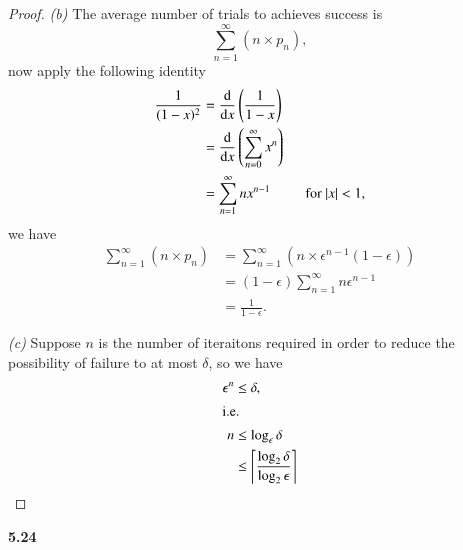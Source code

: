 \documentclass[12pt,a4paper]{article}
\theoremstyle{solution}
\begin{document}
\begin{proof}
{\em (b)} The average number of trials to achieves success is
$$
\sum_{n=1}^{\infty} (n\times p_n),
$$
now apply the following identity
\begin{align*}
\frac{1}{(1-x)^2} &=\frac{\mathrm{d}}{\mathrm{d}x}\left(\frac{1}{1-x}\right) \\
&=\frac{\mathrm{d}}{\mathrm{d}x}\left( \sum_{n=0}^{\infty}x^n \right) \\
&=\sum_{n=1}^{\infty}nx^{n-1} \hspace{5ex} \text{ for } |x|<1,
\end{align*}
we have
\begin{align*}
\sum_{n=1}^{\infty} (n\times p_n)&=\sum_{n=1}^{\infty} (n\times \epsilon^{n-1}(1-\epsilon))\\
&=(1-\epsilon) \sum_{n=1}^{\infty}n{\epsilon}^{n-1}\\
&=\frac{1}{1-\epsilon}.
\end{align*}

{\em (c) }Suppose $n$ is the number of iteraitons required in order to reduce the possibility of failure to at most $\delta$, so we have
\begin{align*}
{\epsilon}^n & \leq \delta,\\
\intertext{i.e.}
n & \leq \log_{\epsilon}{\delta}\\
 & \leq \left\lceil \frac{\log_2 {\delta}}{\log_2 \epsilon} \right\rceil
\end{align*}
\end{proof}

\textbf{5.24}
\end{document}
